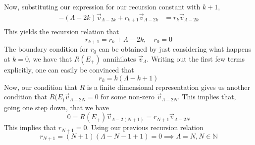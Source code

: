 Now, substituting our expression for our recursion constant with $ k + 1 $, 
 \begin{align*}
	 - ( \Lambda - 2k ) \vec{v}_{ \Lambda - 2k } + r_{ k + 1 } \vec{v}_{ \Lambda - 2k } 
	 &=  r_ k \vec{v}_{ \Lambda - 2k } \\
\end{align*}
This yields the recursion relation that 
\[
 r_{ k +1 } = r_ k + \Lambda - 2k, \quad r_ 0 = 0  
\]  The boundary condition for $ r_0 $ can be 
obtained by just considering what happens at $ k = 0 $, 
we have that  $ R ( E_ + ) $ annihilates $\vec{v} _\Lambda$. 
Writing out the first few terms explicitly, 
one can easily be convinced that 
\[
 r_k = k ( \Lambda - k + 1 ) 
\] Now, our condition that  $ R $ is a 
finite dimensional representation gives us another 
condition that $ R ( E _) \vec{v}_{ \Lambda - 2N }  = 0 $
for some non-zero $ \vec{v}_{ \Lambda - 2 N } $. This implies that, going 
one step down, that we have 
\[
	0 = R ( E_ + ) \vec{v}_{ \Lambda - 2 (  N+ 1 ) } =  r_{ N + 1 } \vec{v}_{ \Lambda - 2N }
\] This implies that $ r_{N + 1 } = 0$. Using our previous 
recursion relation 
\[
	r_{ N + 1 } = ( N + 1 ) ( \Lambda - N - 1+ 1 ) = 0 \implies \Lambda = N, N \in \mathbb{ N } 
\] 
\pagebreak 
